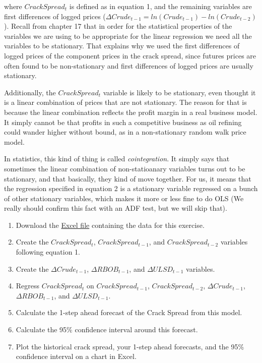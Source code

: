 \documentclass[
  letterpaper,
  DIV=11,
  numbers=noendperiod]{scrreprt}
\begin{document}
where \(Crack Spread_t\) is defined as in equation 1, and the remaining
variables are first differences of logged prices
(\(\Delta Crude_{t-1} = ln(Crude_{t-1}) - ln(Crude_{t-2})\)). Recall
from chapter 17 that in order for the statistical properties of the
variables we are using to be appropriate for the linear regression we
need all the variables to be stationary. That explains why we used the
first differences of logged prices of the component prices in the crack
spread, since futures prices are often found to be non-stationary and
first differences of logged prices are usually stationary.

Additionally, the \(Crack Spread_t\) variable is likely to be
stationary, even thought it is a linear combination of prices that are
not stationary. The reason for that is because the linear combination
reflects the profit margin in a real business model. It simply cannot be
that profits in such a competitive business as oil refining could wander
higher without bound, as in a non-stationary random walk price model.

In statistics, this kind of thing is called \emph{cointegration}. It
simply says that sometimes the linear combination of non-statioanary
variables turns out to be stationary, and that basically, they kind of
move together. For us, it means that the regression specified in
equation 2 is a stationary variable regressed on a bunch of other
stationary variables, which makes it more or less fine to do OLS (We
really should confirm this fact with an ADF test, but we will skip
that).

\begin{enumerate}
\def\labelenumi{\arabic{enumi}.}
\item
  Download the \href{Excel-files/CrackSpread.csv}{Excel file} containing
  the data for this exercise.
\item
  Create the \(CrackSpread_t\), \(CrackSpread_{t-1}\), and
  \(CrackSpread_{t-2}\) variables following equation 1.
\item
  Create the \(\Delta Crude_{t-1}\), \(\Delta RBOB_{t-1}\), and
  \(\Delta ULSD_{t-1}\) variables.
\item
  Regress \(CrackSpread_t\) on \(CrackSpread_{t-1}\),
  \(CrackSpread_{t-2}\), \(\Delta Crude_{t-1}\), \(\Delta RBOB_{t-1}\),
  and \(\Delta ULSD_{t-1}\).
\item
  Calculate the 1-step ahead forecast of the Crack Spread from this
  model.
\item
  Calculate the 95\% confidence interval around this forecast.
\item
  Plot the historical crack spread, your 1-step ahead forecasts, and the
  95\% confidence interval on a chart in Excel.
\end{enumerate}
\end{document}
